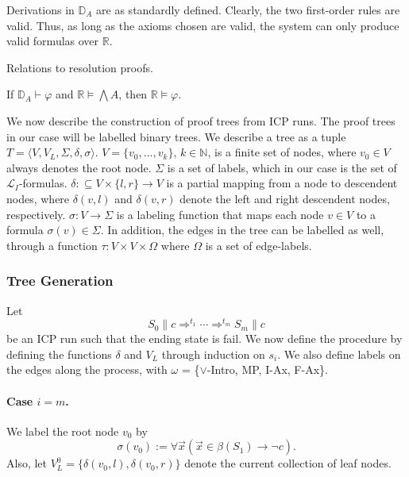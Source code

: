 \documentclass[envcountsect]{llncs}
\begin{document}
Derivations in $\mathbb{D}_A$ are as standardly defined. Clearly, the two
first-order rules are valid. Thus, as long as the axioms chosen are valid,
 the system can only produce valid formulas over $\mathbb{R}$.

\begin{remark}
Relations to resolution proofs. 
\end{remark}


\begin{proposition}
If $\mathbb{D}_A\vdash \varphi$ and $\mathbb{R}\models \bigwedge A$, then $\mathbb{R}\models \varphi$.
\end{proposition}

We now describe the construction of proof trees from ICP runs. The proof trees in
our case will be labelled binary trees. We describe a tree as a tuple $T =
\langle V, V_L,  \Sigma, \delta, \sigma\rangle$. $V = \{v_0, ..., v_k\}$,
$k\in \mathbb{N}$, is a finite set of nodes, where $v_0\in V$ always denotes the
root
node. $\Sigma$ is a set of labels, which in our case is the set of
$\mathcal{L}_I$-formulas. $\delta:\subseteq V\times \{l,r\} \rightarrow V$ is a
partial mapping from a node to descendent nodes, where $\delta(v, l)$ and
$\delta(v, r)$ denote the left and right descendent nodes, respectively.
$\sigma: V\rightarrow \Sigma$ is a labeling function that maps each node
$v\in V$ to a formula $\sigma(v) \in \Sigma$. In addition, the edges in the
tree can be labelled as well, through a function $\tau: V\times V\times \Omega$
where $\Omega$ is a set of edge-labels. 

\subsubsection{Tree Generation} Let 
$$S_0\parallel c\Longrightarrow^{t_1} \cdots
\Longrightarrow^{t_m} S_m\parallel c $$
be an ICP run such that the ending state
is fail. We now define the procedure by defining the functions $\delta$ and
$V_L$ through induction on $s_i$. We also define labels on the edges along the
process, with $\omega$ = \{{$\vee$-Intro}, MP, I-Ax, F-Ax\}. 

\paragraph{Case $i= m$.} We label the root node $v_0$ by 
$$\sigma(v_0) := \forall \vec x( \vec x\in \beta(S_1) \rightarrow \neg c).$$
Also, let $V_L^0= \{\delta(v_0,l), \delta(v_0, r)\}$ denote the current
collection of leaf nodes. 
\end{document}
